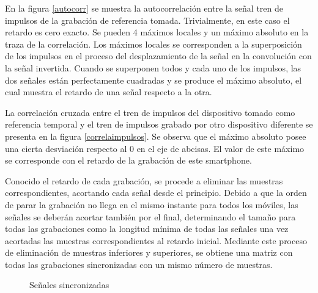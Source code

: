 \documentclass[a4paper,11pt]{book}
\begin{document}
En la figura \ref{autocorr} se muestra la autocorrelación entre la señal tren de impulsos de la grabación de referencia tomada. Trivialmente, en este caso el retardo es cero exacto. Se pueden 4 máximos locales y un máximo absoluto en la traza de la correlación. Los máximos locales se corresponden a la superposición de los impulsos en el proceso del desplazamiento de la señal en la convolución con la señal invertida. Cuando se superponen todos y cada uno de los impulsos, las dos señales están perfectamente cuadradas y se produce el máximo absoluto, el cual muestra el retardo de una señal respecto a la otra.

La correlación cruzada entre el tren de impulsos del dispositivo tomado como referencia temporal y el tren de impulsos grabado por otro dispositivo diferente se presenta en la figura \ref{correlaimpulsos}. Se observa que el máximo absoluto posee una cierta desviación respecto al 0 en el eje de abcisas. El valor de este máximo se corresponde con el retardo de la grabación de este smartphone.

Conocido el retardo de cada grabación, se procede a eliminar las muestras correspondientes, acortando cada señal desde el principio. Debido a que la orden de parar la grabación no llega en el mismo instante para todos los móviles, las señales se deberán acortar también por el final, determinando el tamaño para todas las grabaciones como la longitud mínima de todas las señales una vez acortadas las muestras correspondientes al retardo inicial. Mediante este proceso de eliminación de muestras inferiores y superiores, se obtiene una matriz con todas las grabaciones sincronizadas con un mismo número de muestras.

\begin{figure}
 \centering
 \caption{Señales sincronizadas}
\end{figure}
\end{document}
